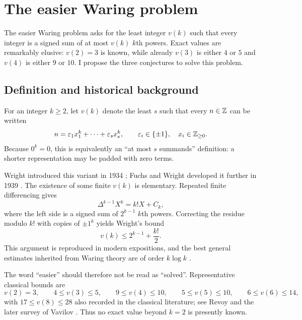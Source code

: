 \documentclass[../../Axiomathic.tex]{subfiles}
\begin{document}
\chapter{The easier Waring problem}
The easier Waring problem asks for the least integer $v(k)$ such that every integer is a signed sum of at most $v(k)$ $k$th powers.  Exact values are remarkably elusive: $v(2)=3$ is known, while already $v(3)$ is either $4$ or $5$ and $v(4)$ is either $9$ or $10$.  I propose the three conjectures to solve this problem. 

\section{Definition and historical background}

For an integer $k\ge2$, let $v(k)$ denote the least $s$ such that every $n\in\mathbb Z$ can be written
\begin{equation}\label{eq:def-v}
  n=\varepsilon_1x_1^k+\cdots+\varepsilon_sx_s^k,
  \qquad \varepsilon_i\in\{\pm1\},\quad x_i\in\mathbb Z_{\ge0}.
\end{equation}
Because $0^k=0$, this is equivalently an ``at most $s$ summands'' definition: a shorter representation may be padded with zero terms.

Wright introduced this variant in 1934 \cite{Wright1934}; Fuchs and Wright developed it further in 1939 \cite{FuchsWright1939}.  The existence of some finite $v(k)$ is elementary.  Repeated finite differencing gives
\[
  \Delta^{k-1}X^k=k!X+C_k,
\]
where the left side is a signed sum of $2^{k-1}$ $k$th powers.  Correcting the residue modulo $k!$ with copies of $\pm1^k$ yields Wright's bound
\begin{equation}\label{eq:wright-elementary}
  v(k)\le 2^{k-1}+\frac{k!}{2}.
\end{equation}
This argument is reproduced in modern expositions, and the best general estimates inherited from Waring theory are of order $k\log k$ \cite{Borwein2002,Vavilov2022}.

The word ``easier'' should therefore not be read as ``solved''.  Representative classical bounds are
\begin{equation}\label{eq:known-small}
  v(2)=3,\qquad
  4\le v(3)\le5,\qquad
  9\le v(4)\le10,\qquad
  5\le v(5)\le10,\qquad
  6\le v(6)\le14,
\end{equation}
with $17\le v(8)\le28$ also recorded in the classical literature; see Revoy \cite{Revoy1991} and the later survey of Vavilov \cite{Vavilov2022}.  Thus no exact value beyond $k=2$ is presently known.
\end{document}
